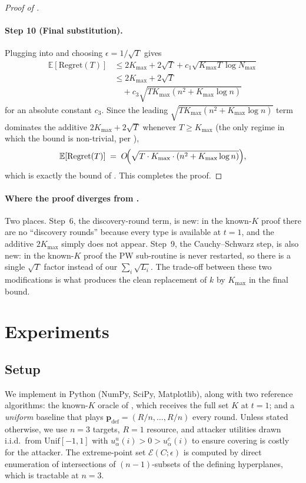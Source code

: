 \documentclass[letterpaper,9pt,twocolumn]{extarticle}
\newcommand{\pvec}{\mathbf{p}}
\newcommand{\cE}{\mathcal{E}}
\newcommand{\EE}{\mathbb{E}}
\newcommand{\Kmax}{K_{\max}}
\newcommand{\Nmax}{N_{\max}}
\newcommand{\Regret}{\mathrm{Regret}}
\theoremstyle{plain}
\theoremstyle{definition}
\theoremstyle{remark}
\begin{document}
\begin{proof}[Proof of ]
\paragraph{Step 10 (Final substitution).}
Plugging  into  and choosing
$\epsilon=1/\sqrt T$ gives
\begin{align*}
\EE[\Regret(T)]&\le 2\Kmax+2\sqrt T+c_1\sqrt{\Kmax T\,\log\Nmax}\\
&\le 2\Kmax+2\sqrt T\\
&\quad+c_3\sqrt{T\Kmax(n^2+\Kmax\log n)}
\end{align*}
for an absolute constant $c_3$. Since the leading
$\sqrt{T\Kmax(n^2+\Kmax\log n)}$ term dominates the additive $2\Kmax+2\sqrt T$
whenever $T\ge\Kmax$ (the only regime in which the bound is non-trivial,
per ),
\[
\EE[\Regret(T)]\;=\;O\!\Bigl(\sqrt{T\cdot\Kmax\cdot(n^2+\Kmax\log n)}\Bigr),
\]
which is exactly the bound of . This completes the proof.
\end{proof}

\paragraph{Where the proof diverges from \citet{balcan2015}.}
Two places. Step~6, the discovery-round term, is new: in the known-$K$
proof there are no ``discovery rounds'' because every type is available at
$t=1$, and the additive $2\Kmax$ simply does not appear. Step~9, the
Cauchy--Schwarz step, is also new: in the known-$K$ proof the PW
sub-routine is never restarted, so there is a single $\sqrt T$ factor
instead of our $\sum_i\sqrt{L_i}$. The trade-off between these two
modifications is what produces the clean replacement of $k$ by $\Kmax$
in the final bound.

\section{Experiments}
\label{sec:exp}

\subsection{Setup}

We implement  in Python (NumPy, SciPy, Matplotlib), along
with two reference algorithms: the known-$K$ oracle of
\citet[\S 5]{balcan2015}, which receives the full set $K$ at $t=1$; and a
\emph{uniform} baseline that plays $\pvec_{\text{def}}=(R/n,\dots,R/n)$
every round. Unless stated otherwise, we use $n=3$ targets, $R=1$
resource, and attacker utilities drawn i.i.d.\ from $\mathrm{Unif}[-1,1]$
with $u_\alpha^u(i)>0>u_\alpha^c(i)$ to ensure covering is costly for the
attacker. The extreme-point set $\cE(C;\epsilon)$ is computed by direct
enumeration of intersections of $(n-1)$-subsets of the defining
hyperplanes, which is tractable at $n=3$.
\end{document}

